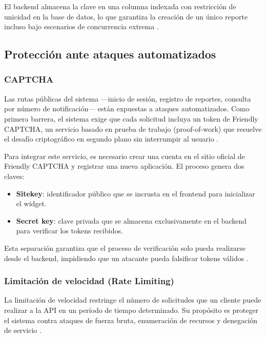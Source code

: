 \documentclass[12pt,letterpaper]{article}
\begin{document}
El backend almacena la clave en una columna indexada con restricción de unicidad en la base de datos, lo que garantiza la creación de un único reporte incluso bajo escenarios de concurrencia extrema \cite{mysql_isolation}.

\subsection{Protección ante ataques automatizados}

\subsubsection{CAPTCHA}

Las rutas públicas del sistema —inicio de sesión, registro de reportes, consulta por número de notificación— están expuestas a ataques automatizados. 
Como primera barrera, el sistema exige que cada solicitud incluya un token de Friendly CAPTCHA, un servicio basado en prueba de trabajo (proof-of-work) que resuelve el desafío criptográfico en segundo plano sin interrumpir al usuario \cite{friendlycaptcha}.

Para integrar este servicio, es necesario crear una cuenta en el sitio oficial de Friendly CAPTCHA y registrar una nueva aplicación. El proceso genera dos claves:

\begin{itemize}
    \item \textbf{Sitekey}: identificador público que se incrusta en el frontend para inicializar el widget.
    \item \textbf{Secret key}: clave privada que se almacena exclusivamente en el backend para verificar los tokens recibidos.
\end{itemize}

Esta separación garantiza que el proceso de verificación solo pueda realizarse desde el backend, impidiendo que un atacante pueda falsificar tokens válidos \cite{friendlycaptcha}.

\subsubsection{Limitación de velocidad (Rate Limiting)}

La limitación de velocidad restringe el número de solicitudes que un cliente puede realizar a la API en un período de tiempo determinado. 
Su propósito es proteger el sistema contra ataques de fuerza bruta, enumeración de recursos y denegación de servicio \cite{microsoft_rate_limiting}.
\end{document}
